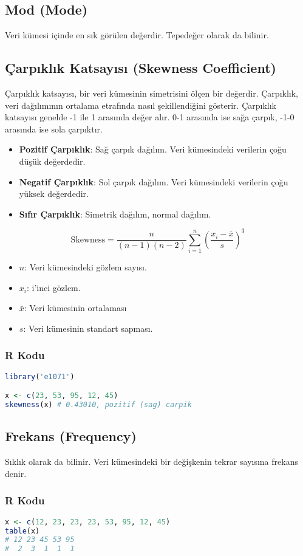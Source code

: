 \newpage

\subsection{Mod (Mode)}
Veri kümesi içinde en sık görülen değerdir. Tepedeğer olarak da bilinir.

\newpage

\subsection{Çarpıklık Katsayısı (Skewness Coefficient)}
Çarpıklık katsayısı, bir veri kümesinin simetrisini ölçen bir değerdir. Çarpıklık, veri dağılımının ortalama etrafında nasıl şekillendiğini gösterir. Çarpıklık katsayısı genelde -1 ile 1 arasında değer alır. 0-1 arasında ise sağa çarpık, -1-0 arasında ise sola çarpıktır. 
\begin{itemize}
	\item \textbf{Pozitif Çarpıklık}: Sağ çarpık dağılım. Veri kümesindeki verilerin çoğu düşük değerdedir.
	\item \textbf{Negatif Çarpıklık}: Sol çarpık dağılım. Veri kümesindeki verilerin çoğu yüksek değerdedir.
	\item \textbf{Sıfır Çarpıklık}: Simetrik dağılım, normal dağılım.
\end{itemize}


\[
\text{Skewness} = \frac{n}{(n-1)(n-2)} \sum_{i=1}^{n} \left( \frac{x_i - \bar{x}}{s} \right)^3
\]

\begin{itemize}
	\item $n$: Veri kümesindeki gözlem sayısı.
	\item $x_i$: i'inci gözlem.
	\item $\bar{x}$: Veri kümesinin ortalaması
	\item $s$: Veri kümesinin standart sapması.
\end{itemize}

\subsubsection{R Kodu}

\begin{lstlisting}[language=R]
library('e1071')

x <- c(23, 53, 95, 12, 45)
skewness(x) # 0.43010, pozitif (sag) carpik
\end{lstlisting}

\newpage

\subsection{Frekans (Frequency)}
Sıklık olarak da bilinir. Veri kümesindeki bir değişkenin tekrar sayısına frekans denir.

\subsubsection{R Kodu}

\begin{lstlisting}[language=R]
x <- c(12, 23, 23, 23, 53, 95, 12, 45)
table(x)
# 12 23 45 53 95 
#  2  3  1  1  1
\end{lstlisting}

\newpage